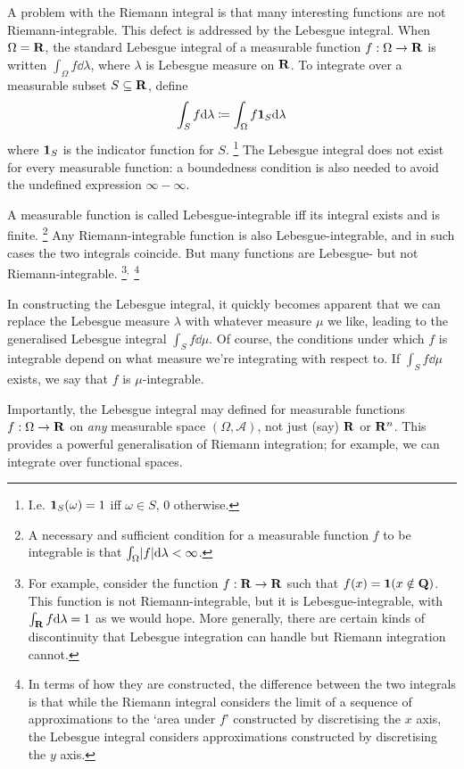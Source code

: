 \documentclass[11pt,letterpaper,reqno,oneside]{article}
\begin{document}
A problem with the Riemann integral is that many interesting functions are not Riemann-integrable. This defect is addressed by the Lebesgue integral.
When $\Omega = \mathbf{R}$, the standard Lebesgue integral of a measurable function $f : \Omega \to \mathbf{R}$ is written $\int_\Omega f \dd \lambda$, where $\lambda$ is Lebesgue measure on $\mathbf{R}$. To integrate over a measurable subset $S \subseteq \mathbf{R}$, define
%
\begin{equation*}
	\int_S f \mathrm{d} \lambda \coloneqq \int_\Omega f \boldsymbol{1}_S \mathrm{d} \lambda
\end{equation*}
%
where $\boldsymbol{1}_S$ is the indicator function for $S$.%
	\footnote{I.e. $\boldsymbol{1}_S(\omega)=1$ iff $\omega \in S$, $0$ otherwise.}
The Lebesgue integral does not exist for every measurable function:
a boundedness condition is also needed to avoid the undefined expression $\infty-\infty$.

A measurable function is called Lebesgue-integrable iff its integral exists and is finite.%
	\footnote{A necessary and sufficient condition for a measurable function $f$ to be integrable is that $\int_\Omega \lvert f\rvert \mathrm{d} \lambda < \infty$.}
Any Riemann-integrable function is also Lebesgue-integrable, and in such cases the two integrals coincide. But many functions are Lebesgue- but not Riemann-integrable.%
	\footnote{For example, consider the function $f : \mathbf{R} \to \mathbf{R}$ such that $f(x) = \boldsymbol{1}( x \notin \mathbf{Q} )$. This function is not Riemann-integrable, but it is Lebesgue-integrable, with $\int_{\mathbf{R}} f \mathrm{d} \lambda = 1$ as we would hope. More generally, there are certain kinds of discontinuity that Lebesgue integration can handle but Riemann integration cannot.}$^,$%
	\footnote{In terms of how they are constructed, the difference between the two integrals is that while the Riemann integral considers the limit of a sequence of approximations to the `area under $f$' constructed by discretising the $x$ axis, the Lebesgue integral considers approximations constructed by discretising the $y$ axis.}

In constructing the Lebesgue integral, it quickly becomes apparent that we can replace the Lebesgue measure $\lambda$ with whatever measure $\mu$ we like, leading to the generalised Lebesgue integral $\int_S f \dd \mu$.
Of course, the conditions under which $f$ is integrable depend on what measure we're integrating with respect to. If $\int_S f \dd \mu$ exists, we say that $f$ is $\mu$-integrable.

Importantly, the Lebesgue integral may defined for measurable functions $f : \Omega \to \mathbf{R}$ on \emph{any} measurable space $\left( \Omega, \mathcal{A} \right)$, not just (say) $\mathbf{R}$ or $\mathbf{R}^n$.
This provides a powerful generalisation of Riemann integration; for example, we can integrate over functional spaces.
\end{document}
